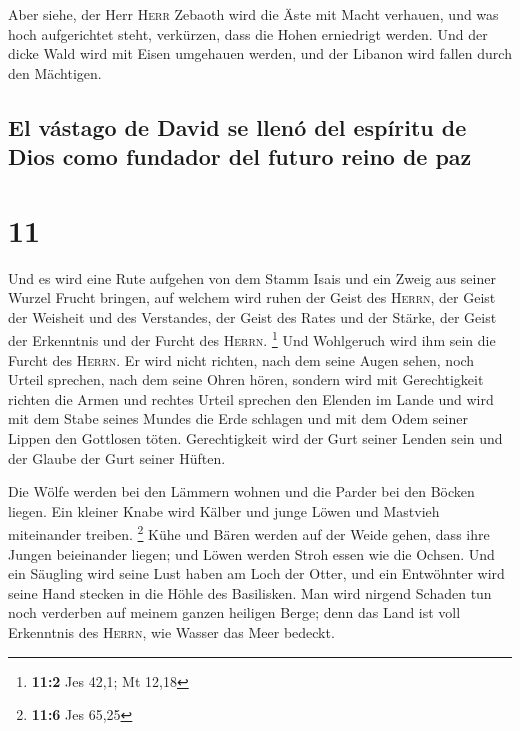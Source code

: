  Aber siehe, der Herr \textsc{Herr} Zebaoth wird die Äste
mit Macht verhauen, und was hoch aufgerichtet steht, verkürzen, dass die
Hohen erniedrigt werden.  Und der dicke Wald wird mit
Eisen umgehauen werden, und der Libanon wird fallen durch den Mächtigen.

\hypertarget{el-vuxe1stago-de-david-se-llenuxf3-del-espuxedritu-de-dios-como-fundador-del-futuro-reino-de-paz}{%
\subsection{El vástago de David se llenó del espíritu de Dios como
fundador del futuro reino de
paz}\label{el-vuxe1stago-de-david-se-llenuxf3-del-espuxedritu-de-dios-como-fundador-del-futuro-reino-de-paz}}

\hypertarget{section-10}{%
\section{11}\label{section-10}}

 Und es wird eine Rute aufgehen von dem Stamm Isais und
ein Zweig aus seiner Wurzel Frucht bringen,  auf welchem
wird ruhen der Geist des \textsc{Herrn}, der Geist der Weisheit und des
Verstandes, der Geist des Rates und der Stärke, der Geist der Erkenntnis
und der Furcht des \textsc{Herrn}. \footnote{\textbf{11:2} Jes 42,1; Mt
  12,18}  Und Wohlgeruch wird ihm sein die Furcht des
\textsc{Herrn}. Er wird nicht richten, nach dem seine Augen sehen, noch
Urteil sprechen, nach dem seine Ohren hören,  sondern wird
mit Gerechtigkeit richten die Armen und rechtes Urteil sprechen den
Elenden im Lande und wird mit dem Stabe seines Mundes die Erde schlagen
und mit dem Odem seiner Lippen den Gottlosen töten. 
Gerechtigkeit wird der Gurt seiner Lenden sein und der Glaube der Gurt
seiner Hüften.

 Die Wölfe werden bei den Lämmern wohnen und die Parder
bei den Böcken liegen. Ein kleiner Knabe wird Kälber und junge Löwen und
Mastvieh miteinander treiben. \footnote{\textbf{11:6} Jes 65,25}
 Kühe und Bären werden auf der Weide gehen, dass ihre
Jungen beieinander liegen; und Löwen werden Stroh essen wie die Ochsen.
 Und ein Säugling wird seine Lust haben am Loch der Otter,
und ein Entwöhnter wird seine Hand stecken in die Höhle des Basilisken.
 Man wird nirgend Schaden tun noch verderben auf meinem
ganzen heiligen Berge; denn das Land ist voll Erkenntnis des
\textsc{Herrn}, wie Wasser das Meer bedeckt.

